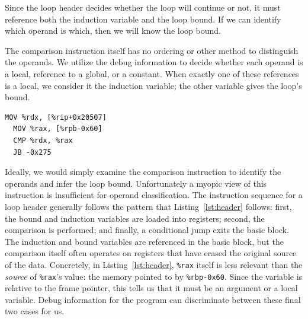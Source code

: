 
Since the loop header decides whether the loop will continue or not, it
must reference both the induction variable and the loop bound.  If we
can identify which operand is which, then we will know the loop bound.

The comparison instruction itself has no ordering or other method to
distinguish the operands.  We utilize the debug information to decide
whether each operand is a local, reference to a global, or a constant.
When exactly one of these references is a local, we consider it the
induction variable; the other variable gives the loop's bound.

\begin{lstlisting}[label=lst:header,caption=Instructions within a
sample loop header.  Both the induction variable and the loop bound
appear as arguments to the \texttt{CMP} instruction.  The preceding
instructions are necessary for distinguishing between the two
variables.]
  MOV %rdx, [%rip+0x20507]
  MOV %rax, [%rpb-0x60]
  CMP %rdx, %rax
  JB -0x275
\end{lstlisting}

Ideally, we would simply examine the comparison instruction to identify
the operands and infer the loop bound. Unfortunately a myopic view of
this instruction is insufficient for operand classification.
The instruction sequence for a loop header generally follows the
pattern that
Listing~\ref{lst:header} follows: first, the bound and induction
variables are loaded into registers; second, the comparison is
performed; and finally, a conditional jump exits the basic block.  The
induction and bound variables are referenced in the basic block, but
the comparison itself often operates on registers that have erased the
original source of the data.  Concretely, in Listing~\ref{lst:header},
\texttt{\%rax} itself is less relevant than the \emph{source} of
\texttt{\%rax}'s
value: the memory pointed to by \texttt{\%rbp-0x60}.  Since the variable
is relative to the frame pointer, this tells us that it must be an
argument or a local variable.  Debug information for the program can
discriminate between these final two cases for us.


